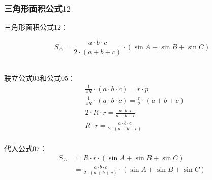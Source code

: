 \documentclass[UTF8]{ctexart}
\begin{document}
\subsubsection{三角形面积公式$12$}
    三角形面积公式$12$：
    \begin{large}
        \begin{equation*}
            S_{\triangle}=\frac{a\cdot b\cdot c}{2\cdot\left(a+b+c\right)}\cdot(\sin{A}+\sin{B}+\sin{C})
        \end{equation*}
    \end{large}\\
    \setcounter{equation}{0}
    联立公式$03$和公式$05$：
    \begin{align}
        &\frac{1}{4R}\cdot(a\cdot b\cdot c)=r\cdot p\\[3mm]
        &\frac{1}{4R}\cdot(a\cdot b\cdot c)=\frac{r}{2}\cdot(a+b+c)\\[3mm]
        &2\cdot R\cdot r=\frac{a\cdot b\cdot c}{a+b+c}\\[3mm]
        &R\cdot r=\frac{a\cdot b\cdot c}{2\cdot(a+b+c)}
    \end{align}\\
    代入公式$07$：
    \begin{align}
        S_{\triangle}
        &=R\cdot r\cdot(\sin{A}+\sin{B}+\sin{C})\\[3mm]
        &=\frac{a\cdot b\cdot c}{2\cdot(a+b+c)}\cdot(\sin{A}+\sin{B}+\sin{C})
    \end{align}

\newpage
\end{document}

